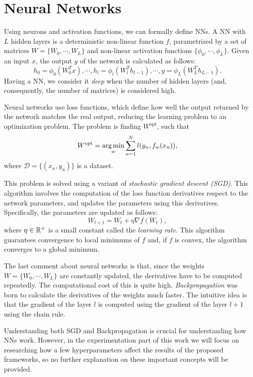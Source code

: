 \section{Neural Networks}

Using neurons and activation functions, we can formally define NNs. A NN with $L$ hidden layers is a deterministic non-linear function $f$, parametrized by a set of matrices $W = \{W_0,\cdots,W_L\}$ and non-linear activation functions $\{\phi_0,\cdots,\phi_L\}$. Given an input $x$, the output $y$ of the network is calculated as follows:
\[
h_0 = \phi_0\left(W_0^Tx\right), \cdots, h_l = \phi_l\left(W_l^T h_{l-1}\right),\cdots, y = \phi_L\left(W_L^T h_{L-1}\right).
\]
Having a NN, we consider it \emph{deep} when the number of hidden layers (and, consequently, the number of matrices) is considered high. 

Neural networks use loss functions, which define how well the output returned by the network matches the real output, reducing the learning problem to an optimization problem. The problem is finding $W^{\operatorname{opt}}$, such that
\[
W^{\operatorname{opt}}   = \operatorname*{arg\,min}_{w} \sum_{n = 1}^N l(y_n, f_w(x_n)),
\]
where $\mathcal D = \{(x_n,y_n)\}$ is a dataset.

This problem is solved using a variant of \emph{stochastic gradient descent (SGD)}. This algorithm involves the computation of the loss function derivatives respect to the network parameters, and updates the parameters using this derivatives. Specifically, the parameters are updated as follows:
\[
W_{t+1} = W_t + \eta \nabla f(W_t),
\]
where $\eta \in \mathbb{R}^+$ is a small constant called the \emph{learning rate}. This algorithm guarantees convergence to local minimums of $f$ and, if $f$ is convex, the algorithm converges to a global minimum.

The last comment about neural networks is that, since the weights $W = \{W_0,\cdots,W_L\}$ are constantly updated, the derivatives have to be computed repeatedly. The computational cost of this is quite high. \emph{Backpropagation} was born to calculate the derivatives of the weights much faster. The intuitive idea is that the gradient of the layer $l$ is computed using the gradient of the layer $l+1$ using the chain rule.

Understanding both SGD and Backpropagation is crucial for understanding how NNs  work. However, in the experimentation part of this work we will focus on researching how a few hyperparameters affect the results of the proposed frameworks, so no further explanation on these important concepts will be provided.

